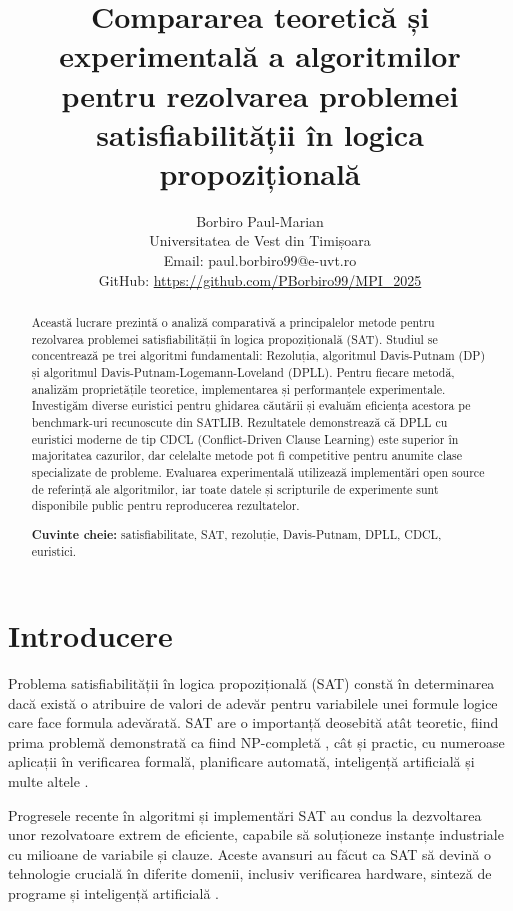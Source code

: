 \documentclass[a4paper,10pt]{article}
\title{\textbf{Compararea teoretică și experimentală a algoritmilor pentru rezolvarea problemei satisfiabilității în logica propozițională}}
\author{Borbiro Paul-Marian\\
        Universitatea de Vest din Timișoara\\
        Email: paul.borbiro99@e-uvt.ro\\
        GitHub: \url{https://github.com/PBorbiro99/MPI_2025}
}
\begin{document}
\maketitle

\begin{abstract}
Această lucrare prezintă o analiză comparativă a principalelor metode pentru rezolvarea problemei satisfiabilității în logica propozițională (SAT). Studiul se concentrează pe trei algoritmi fundamentali: Rezoluția, algoritmul Davis-Putnam (DP) și algoritmul Davis-Putnam-Logemann-Loveland (DPLL). Pentru fiecare metodă, analizăm proprietățile teoretice, implementarea și performanțele experimentale. Investigăm diverse euristici pentru ghidarea căutării și evaluăm eficiența acestora pe benchmark-uri recunoscute din SATLIB. Rezultatele demonstrează că DPLL cu euristici moderne de tip CDCL (Conflict-Driven Clause Learning) este superior în majoritatea cazurilor, dar celelalte metode pot fi competitive pentru anumite clase specializate de probleme. Evaluarea experimentală utilizează implementări open source de referință ale algoritmilor, iar toate datele și scripturile de experimente sunt disponibile public pentru reproducerea rezultatelor.

\noindent\textbf{Cuvinte cheie:} satisfiabilitate, SAT, rezoluție, Davis-Putnam, DPLL, CDCL, euristici.
\end{abstract}

\section{Introducere}

Problema satisfiabilității în logica propozițională (SAT) constă în determinarea dacă există o atribuire de valori de adevăr pentru variabilele unei formule logice care face formula adevărată. SAT are o importanță deosebită atât teoretic, fiind prima problemă demonstrată ca fiind NP-completă \cite{Cook1971}, cât și practic, cu numeroase aplicații în verificarea formală, planificare automată, inteligență artificială și multe altele \cite{Biere2021}.

Progresele recente în algoritmi și implementări SAT au condus la dezvoltarea unor rezolvatoare extrem de eficiente, capabile să soluționeze instanțe industriale cu milioane de variabile și clauze. Aceste avansuri au făcut ca SAT să devină o tehnologie crucială în diferite domenii, inclusiv verificarea hardware, sinteză de programe și inteligență artificială \cite{Marques-Silva2021}.
\end{document}
